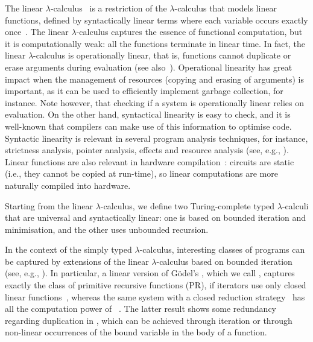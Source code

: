 \documentclass{article}
\begin{document}
The linear $\lambda$-calculus~\cite{AbramskyS:comill} is a restriction
of the $\lambda$-calculus that models linear functions, defined by
syntactically linear terms where each variable occurs
exactly once~\cite{Kfoury}. The linear $\lambda$-calculus captures the essence of
functional computation, but it is computationally weak: all the
functions terminate in linear time. In fact, the linear
$\lambda$-calculus is operationally linear, that is, functions cannot
duplicate or erase arguments during evaluation (see
also~\cite{alves05tcs,klop07}). Operational linearity has great impact
when the management of resources (copying and erasing of arguments) is
important, as it can be used to efficiently implement garbage
collection, for instance. Note however, that checking if a system is
operationally linear relies on evaluation. On the other hand,
syntactical linearity is easy to check, and it is well-known that
compilers can make use of this information to optimise code. Syntactic
linearity is relevant in several program analysis techniques, for
instance, strictness analysis, pointer analysis, effects and resource
analysis (see, e.g.,
\cite{BoudolG:semlcr,EhrhardT:difflc,Wansbrough00,Wadler90,David_WalkerChapter,NoekerConcurrentClean,HofmannJ03,EggerMS09}). Linear
functions are also relevant in hardware compilation~\cite{Ghica07}:
circuits are static (i.e., they cannot be copied at run-time), so
linear computations are more naturally compiled into hardware.

Starting from the linear $\lambda$-calculus, we define two 
Turing-complete typed $\lambda$-calculi that are
universal and syntactically linear: one is based on bounded iteration
and minimisation, and the other uses unbounded recursion.

In the context of the simply typed $\lambda$-calculus, interesting
classes of programs can be captured by extensions of the linear
$\lambda$-calculus based on bounded iteration (see, e.g.,
\cite{G98,GirardJY:boull,AR02,BM04,H99,L04,T01}). In particular, a
linear version of G\"odel's \ST, which we call \LLCI, captures exactly
the class of primitive recursive functions (PR), if iterators use only
closed linear functions~\cite{Lago05}, whereas the same system with a
closed reduction strategy~\cite{fernandezM:clores} has all the
computation power of \ST~\cite{AlvesS:TCS}. The latter result shows
some redundancy regarding duplication in \ST, which can be achieved
through iteration or through non-linear occurrences of the bound
variable in the body of a function.
\end{document}
